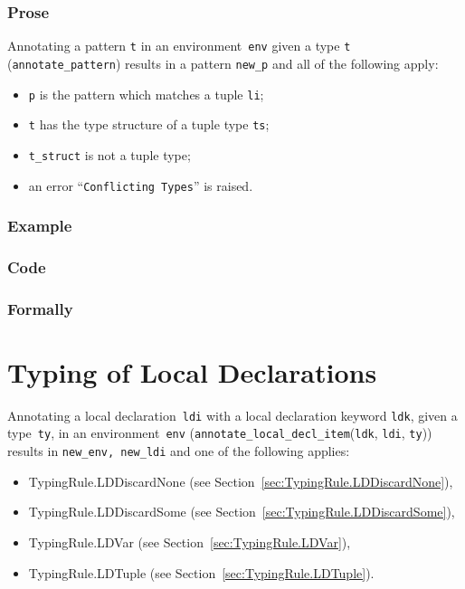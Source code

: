 \documentclass{book}
\newcommand\annotatelocaldeclitem[1]{\texttt{annotate\_local\_decl\_item}(#1)}
\newcommand\ldi[0]{\texttt{ldi}}
\newcommand\ldk[0]{\texttt{ldk}}
\newcommand\tty[0]{\texttt{ty}}
\begin{document}
  \subsection{Prose}
   Annotating a pattern \texttt{t} in an environment~\texttt{env} given a type \texttt{t} (\texttt{annotate\_pattern}) results in a pattern \texttt{new\_p} and all of the following apply:
   \begin{itemize}
   \item \texttt{p} is the pattern which matches a tuple \texttt{li};
   \item \texttt{t} has the type structure of a tuple type \texttt{ts};
   \item \texttt{t\_struct} is not a tuple type;
   \item an error ``\texttt{Conflicting Types}'' is raised. 
   \end{itemize}

  \subsection{Example}

  \subsection{Code}

\begin{emptyformal}
    \subsection{Formally}
\end{emptyformal}


\chapter{Typing of Local Declarations}

Annotating a local declaration~\texttt{ldi} with a local declaration keyword \texttt{ldk}, given a type~\texttt{ty}, in an
environment~\texttt{env} (\annotatelocaldeclitem{\ldk, \ldi, \tty}) results in \texttt{new\_env, new\_ldi} and one of the following applies:
\begin{itemize}
\item TypingRule.LDDiscardNone (see Section~\ref{sec:TypingRule.LDDiscardNone}),
\item TypingRule.LDDiscardSome (see Section~\ref{sec:TypingRule.LDDiscardSome}),
\item TypingRule.LDVar (see Section~\ref{sec:TypingRule.LDVar}),
\item TypingRule.LDTuple (see Section~\ref{sec:TypingRule.LDTuple}).
\end{itemize}
\end{document}
